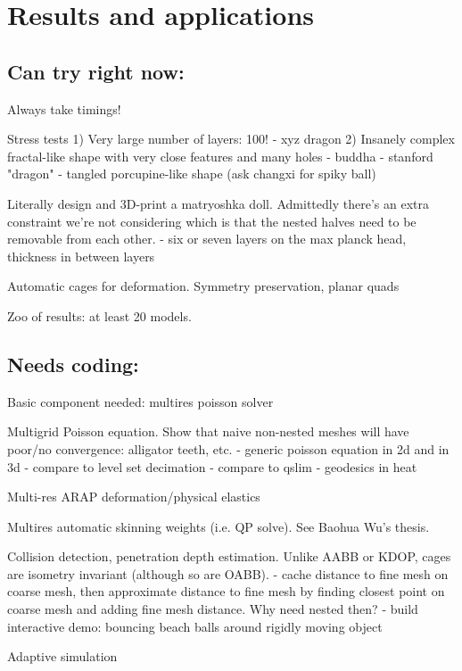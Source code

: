
\section{Results and applications}
\label{sec:results}

\subsection{Can try right now:}

Always take timings!

Stress tests
  1) Very large number of layers: 100!
    - xyz dragon
  2) Insanely complex fractal-like shape with very close features and many holes
    - buddha
    - stanford "dragon"
    - tangled porcupine-like shape (ask changxi for spiky ball)

Literally design and 3D-print a matryoshka doll. Admittedly there's an extra
constraint we're not considering which is that the nested halves need to be
removable from each other.
  - six or seven layers on the max planck head, thickness in between layers

Automatic cages for deformation. Symmetry preservation, planar quads

Zoo of results: at least 20 models.

\subsection{Needs coding:}

Basic component needed: multires poisson solver

Multigrid Poisson equation. Show that naive non-nested meshes will have
poor/no convergence: alligator teeth, etc.
  - generic poisson equation in 2d and in 3d
    - compare to level set decimation
    - compare to qslim
  - geodesics in heat 

Multi-res ARAP deformation/physical elastics

Multires automatic skinning weights (i.e. QP solve). See Baohua Wu's thesis.

Collision detection, penetration depth estimation. Unlike AABB or KDOP, cages
are isometry invariant (although so are OABB).
  - cache distance to fine mesh on coarse mesh, then approximate distance to
    fine mesh by finding closest point on coarse mesh and adding fine mesh
    distance. Why need nested then?
  - build interactive demo: bouncing beach balls around rigidly moving object

Adaptive simulation \cite{Debunne:2001:DRD}

